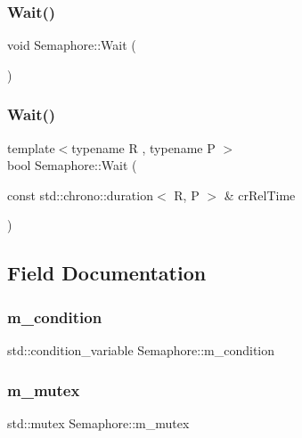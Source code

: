 \subsubsection{\texorpdfstring{Wait()}{Wait()}\hspace{0.1cm}{\footnotesize\ttfamily [1/2]}}
{\footnotesize\ttfamily void Semaphore\+::\+Wait (\begin{DoxyParamCaption}{ }\end{DoxyParamCaption})}

\mbox{\label{classSemaphore_a7f700173ae86ae623684109066e07656}} 
\subsubsection{\texorpdfstring{Wait()}{Wait()}\hspace{0.1cm}{\footnotesize\ttfamily [2/2]}}
{\footnotesize\ttfamily template$<$typename R , typename P $>$ \\
bool Semaphore\+::\+Wait (\begin{DoxyParamCaption}\item[{const std\+::chrono\+::duration$<$ R, P $>$ \&}]{cr\+Rel\+Time }\end{DoxyParamCaption})}



\subsection{Field Documentation}
\mbox{\label{classSemaphore_a2b04d3a53f1fc1a13d7ed5d19d9e2be9}} 
\subsubsection{\texorpdfstring{m\+\_\+condition}{m\_condition}}
{\footnotesize\ttfamily std\+::condition\+\_\+variable Semaphore\+::m\+\_\+condition\hspace{0.3cm}{\ttfamily [private]}}

\mbox{\label{classSemaphore_a6490f302f311da3ce373a81672673296}} 
\subsubsection{\texorpdfstring{m\+\_\+mutex}{m\_mutex}}
{\footnotesize\ttfamily std\+::mutex Semaphore\+::m\+\_\+mutex\hspace{0.3cm}{\ttfamily [private]}}


